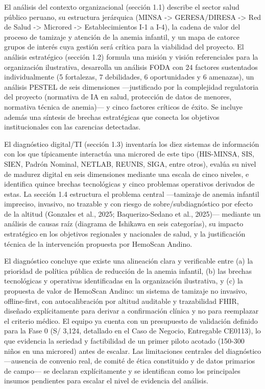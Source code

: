 \documentclass[11pt,a4paper]{article}
\begin{document}
El análisis del contexto organizacional (sección 1.1) describe el sector salud público peruano, su estructura jerárquica (MINSA -\textgreater{} GERESA/DIRESA -\textgreater{} Red de Salud -\textgreater{} Microred -\textgreater{} Establecimientos I-1 a I-4), la cadena de valor del proceso de tamizaje y atención de la anemia infantil, y un mapa de catorce grupos de interés cuya gestión será crítica para la viabilidad del proyecto. El análisis estratégico (sección 1.2) formula una misión y visión referenciales para la organización ilustrativa, desarrolla un análisis FODA con 24 factores sustentados individualmente (5 fortalezas, 7 debilidades, 6 oportunidades y 6 amenazas), un análisis PESTEL de seis dimensiones ---justificado por la complejidad regulatoria del proyecto (normativa de IA en salud, protección de datos de menores, normativa técnica de anemia)--- y cinco factores críticos de éxito. Se incluye además una síntesis de brechas estratégicas que conecta los objetivos institucionales con las carencias detectadas.

El diagnóstico digital/TI (sección 1.3) inventaría los diez sistemas de información con los que típicamente interactúa una microred de este tipo (HIS-MINSA, SIS, SIEN, Padrón Nominal, NETLAB, REUNIS, SIGA, entre otros), evalúa su nivel de madurez digital en seis dimensiones mediante una escala de cinco niveles, e identifica quince brechas tecnológicas y cinco problemas operativos derivados de estas. La sección 1.4 estructura el problema central ---tamizaje de anemia infantil impreciso, invasivo, no trazable y con riesgo de sobre/subdiagnóstico por efecto de la altitud (Gonzales et al., 2025; Baquerizo-Sedano et al., 2025)--- mediante un análisis de causas raíz (diagrama de Ishikawa en seis categorías), su impacto estratégico en los objetivos regionales y nacionales de salud, y la justificación técnica de la intervención propuesta por HemoScan Andino.

El diagnóstico concluye que existe una alineación clara y verificable entre (a) la prioridad de política pública de reducción de la anemia infantil, (b) las brechas tecnológicas y operativas identificadas en la organización ilustrativa, y (c) la propuesta de valor de HemoScan Andino: un sistema de tamizaje no invasivo, offline-first, con autocalibración por altitud auditable y trazabilidad FHIR, diseñado explícitamente para derivar a confirmación clínica y no para reemplazar el criterio médico. El equipo ya cuenta con un presupuesto de validación definido para la Fase 0 (S/ 3,124, detallado en el Caso de Negocio, Entregable CE0113), lo que evidencia la seriedad y factibilidad de un primer piloto acotado (150-300 niños en una microred) antes de escalar. Las limitaciones centrales del diagnóstico ---ausencia de convenio real, de comité de ética constituido y de datos primarios de campo--- se declaran explícitamente y se identifican como los principales insumos pendientes para escalar el nivel de evidencia del análisis.
\end{document}
